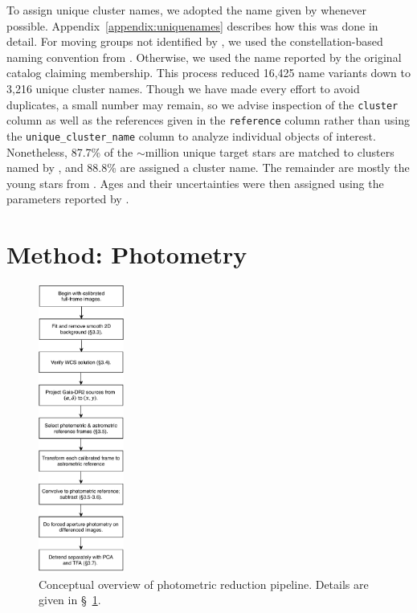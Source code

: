 \documentclass[12pt,twocolumn,tighten]{aastex62}
\begin{document}
To assign unique cluster names, we adopted the name given by
\citet{Kharchenko_et_al_2013} whenever possible.
Appendix~\ref{appendix:uniquenames} describes  how this was done in
detail.  For moving groups not identified by
\citet{Kharchenko_et_al_2013}, we used the constellation-based naming
convention from \citet{gagne_banyan_XI_2018}.  Otherwise, we used the
name reported by the original catalog claiming membership.  This
process reduced 16,425 name variants down to 3,216 unique cluster
names.  Though we have made every effort to avoid duplicates, a small
number may remain, so we advise inspection of the \texttt{cluster}
column as well as the references given in the \texttt{reference}
column rather than using the \texttt{unique\_cluster\_name} column to
analyze individual objects of interest.  Nonetheless, 87.7\% of the
$\sim$million unique target stars are matched to clusters named by
\citet{Kharchenko_et_al_2013}, and 88.8\% are assigned a cluster name.
The remainder are mostly the young stars from \citet{zari_3d_2018}.
Ages and their uncertainties were then assigned using the parameters
reported by \citet{Kharchenko_et_al_2013}.




\section{Method: Photometry}
\label{sec:method}

\begin{figure}[!t]
	\begin{center}
		\leavevmode
		\includegraphics[width=0.25\textwidth]{pipelineoverview.pdf}
	\end{center}
	\vspace{-0.2cm}
	\caption{
    Conceptual overview of photometric reduction pipeline.
    Details are given in \S~\ref{sec:method}.
	\label{fig:pipeline}
	}
\end{figure}
\end{document}
